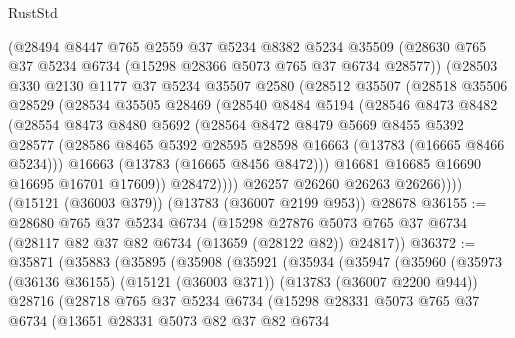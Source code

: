 \begin{lexlean}{RustStd}
\begin{coremodule}
        (@28494
          @8447
          @765
          @2559
          @37
          @5234
          @8382
          @5234
          @35509
          (@28630 @765 @37 @5234 @6734 (@15298 @28366 @5073 @765 @37 @6734 @28577))
          (@28503
            @330
            @2130
            @1177
            @37
            @5234
            @35507
            @2580
            (@28512
              @35507
              (@28518
                @35506
                @28529
                (@28534
                  @35505
                  @28469
                  (@28540
                    @8484
                    @5194
                    (@28546
                      @8473
                      @8482
                      (@28554
                        @8473
                        @8480
                        @5692
                        (@28564
                          @8472
                          @8479
                          @5669
                          @8455
                          @5392
                          @28577
                          (@28586 @8465 @5392 @28595 @28598 @16663 (@13783 (@16665 @8466 @5234)))
                          @16663
                          (@13783 (@16665 @8456 @8472)))
                        @16681
                        @16685
                        @16690
                        @16695
                        @16701
                        @17609))
                    @28472))))
            @26257
            @26260
            @26263
            @26266))))
    (@15121 (@36003 @379))
    (@13783 (@36007 @2199 @953))
    @28678
@36155 := @28680
    @765
    @37
    @5234
    @6734
    (@15298 @27876 @5073 @765 @37 @6734 (@28117 @82 @37 @82 @6734 (@13659 (@28122 @82)) @24817))
@36372 := @35871
    (@35883
      (@35895
        (@35908
          (@35921
            (@35934
              (@35947
                (@35960
                  (@35973
                    (@36136 @36155)
                    (@15121 (@36003 @371))
                    (@13783 (@36007 @2200 @944))
                    @28716
                    (@28718
                      @765
                      @37
                      @5234
                      @6734
                      (@15298
                        @28331
                        @5073
                        @765
                        @37
                        @6734
                        (@13651
                          @28331
                          @5073
                          @82
                          @37
                          @82
                          @6734

\end{coremodule}
\end{lexlean}
